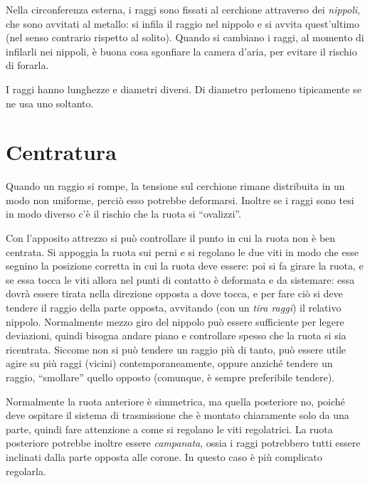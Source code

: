 Nella circonferenza esterna, i raggi sono fissati al cerchione attraverso dei \emph{nippoli}, che sono avvitati al metallo: si infila il raggio nel nippolo e si avvita quest'ultimo (nel senso contrario rispetto al solito).
Quando si cambiano i raggi, al momento di infilarli nei nippoli, è buona cosa sgonfiare la camera d'aria, per evitare il rischio di forarla.

I raggi hanno lunghezze e diametri diversi. Di diametro perlomeno tipicamente se ne usa uno soltanto.

\section{Centratura}
Quando un raggio si rompe, la tensione sul cerchione rimane distribuita in un modo non uniforme, perciò esso potrebbe deformarsi.
Inoltre se i raggi sono tesi in modo diverso c'è il rischio che la ruota si ``ovalizzi''.

Con l'apposito attrezzo si può controllare il punto in cui la ruota non è ben centrata.
Si appoggia la ruota sui perni e si regolano le due viti in modo che esse segnino la posizione corretta in cui la ruota deve essere: poi si fa girare la ruota, e se essa tocca le viti allora nel punti di contatto è deformata e da sistemare: essa dovrà essere tirata nella direzione opposta a dove tocca, e per fare ciò si deve tendere il raggio della parte opposta, avvitando (con un \emph{tira raggi}) il relativo nippolo.
Normalmente mezzo giro del nippolo può essere sufficiente per legere deviazioni, quindi bisogna andare piano e controllare spesso che la ruota si sia ricentrata.
Siccome non si può tendere un raggio più di tanto, può essere utile agire su più raggi (vicini) contemporaneamente, oppure anziché tendere un raggio, ``smollare'' quello opposto (comunque, è sempre preferibile tendere).

Normalmente la ruota anteriore è simmetrica, ma quella posteriore no, poiché deve ospitare il sistema di trasmissione che è montato chiaramente solo da una parte, quindi fare attenzione a come si regolano le viti regolatrici.
La ruota posteriore potrebbe inoltre essere \emph{campanata}, ossia i raggi potrebbero tutti essere inclinati dalla parte opposta alle corone.
In questo caso è più complicato regolarla.
